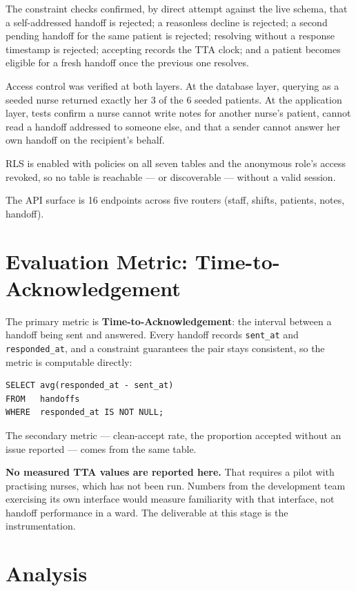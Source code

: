 \documentclass{tietreport}
\begin{document}
The constraint checks confirmed, by direct attempt against
the live schema, that a self-addressed handoff is rejected;
a reasonless decline is rejected; a second pending handoff
for the same patient is rejected; resolving without a
response timestamp is rejected; accepting records the TTA
clock; and a patient becomes eligible for a fresh handoff
once the previous one resolves.

Access control was verified at both layers. At the database
layer, querying as a seeded nurse returned exactly her 3 of
the 6 seeded patients. At the application layer, tests
confirm a nurse cannot write notes for another nurse's
patient, cannot read a handoff addressed to someone else,
and that a sender cannot answer her own handoff on the
recipient's behalf.

RLS is enabled with policies on all seven tables and the
anonymous role's access revoked, so no table is reachable
--- or discoverable --- without a valid session.

The API surface is 16 endpoints across five routers (staff,
shifts, patients, notes, handoff).

\section{Evaluation Metric: Time-to-Acknowledgement}

The primary metric is \textbf{Time-to-Acknowledgement}: the
interval between a handoff being sent and answered. Every
handoff records \texttt{sent\_at} and \texttt{responded\_at},
and a constraint guarantees the pair stays consistent, so
the metric is computable directly:

\begin{verbatim}
SELECT avg(responded_at - sent_at)
FROM   handoffs
WHERE  responded_at IS NOT NULL;
\end{verbatim}

The secondary metric --- clean-accept rate, the proportion
accepted without an issue reported --- comes from the same
table.

\textbf{No measured TTA values are reported here.} That
requires a pilot with practising nurses, which has not been
run. Numbers from the development team exercising its own
interface would measure familiarity with that interface, not
handoff performance in a ward. The deliverable at this stage
is the instrumentation.

\section{Analysis}
\end{document}
